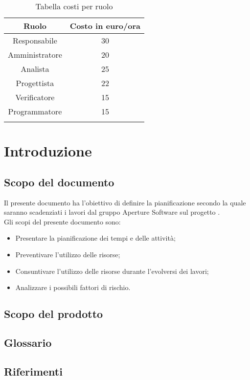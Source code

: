 \begin{center}
\begin{longtable}{|c|c|}
\toprule
\textbf{Ruolo} & \textbf{Costo in euro/ora}\\
\midrule
Responsabile & 30\\
Amministratore & 20\\
Analista & 25\\
Progettista & 22\\
Verificatore & 15\\
Programmatore & 15\\
\bottomrule
\caption{Tabella costi per ruolo}
\label{tab:costiruolo}
\end{longtable}
\end{center} 

\newpage
\section{Introduzione}
\label{3.0}
\subsection{Scopo del documento}
\label{3.1}
Il presente documento ha l'obiettivo di definire la pianificazione secondo la quale saranno scadenziati i lavori dal gruppo Aperture Software sul progetto \Progetto{}.\\

Gli scopi del presente documento sono:
\begin{itemize}
\item Presentare la pianificazione dei tempi e delle attività;
\item Preventivare l'utilizzo delle risorse;
\item Consuntivare l'utilizzo delle risorse durante l'evolversi dei lavori;
\item Analizzare i possibili fattori di rischio.
\end{itemize}

\subsection{Scopo del prodotto}
\label{3.2}
\Prodotto{}

\subsection{Glossario}
\label{3.3}
\Glossario{}

\subsection{Riferimenti}
\label{3.4}
